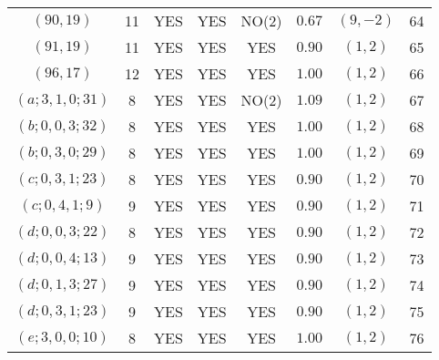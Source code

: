 \begin{longtable}{|c|c|c|c|c|c|c|c|}
$(90,19)$ & 11 & YES & YES & NO(2) & $0.67$ & $(9,-2)$ & 64\\
$(91,19)$ & 11 & YES & YES & YES & $0.90$ & $(1,2)$ & 65\\
$(96,17)$ & 12 & YES & YES & YES & $1.00$ & $(1,2)$ & 66\\
$(a;3,1,0;31)$ & 8 & YES & YES & NO(2) & $1.09$ & $(1,2)$ & 67\\
$(b;0,0,3;32)$ & 8 & YES & YES & YES & $1.00$ & $(1,2)$ & 68\\
$(b;0,3,0;29)$ & 8 & YES & YES & YES & $1.00$ & $(1,2)$ & 69\\
$(c;0,3,1;23)$ & 8 & YES & YES & YES & $0.90$ & $(1,2)$ & 70\\
$(c;0,4,1;9)$ & 9 & YES & YES & YES & $0.90$ & $(1,2)$ & 71\\
$(d;0,0,3;22)$ & 8 & YES & YES & YES & $0.90$ & $(1,2)$ & 72\\
$(d;0,0,4;13)$ & 9 & YES & YES & YES & $0.90$ & $(1,2)$ & 73\\
$(d;0,1,3;27)$ & 9 & YES & YES & YES & $0.90$ & $(1,2)$ & 74\\
$(d;0,3,1;23)$ & 9 & YES & YES & YES & $0.90$ & $(1,2)$ & 75\\
$(e;3,0,0;10)$ & 8 & YES & YES & YES & $1.00$ & $(1,2)$ & 76
\end{longtable}
